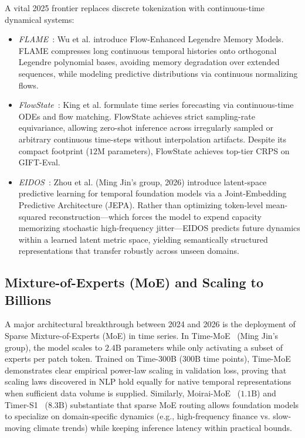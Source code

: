 A vital 2025 frontier replaces discrete tokenization with continuous-time dynamical systems:
\begin{itemize}[leftmargin=*]
    \item \emph{FLAME}~\cite{wu2025flame}: Wu et al. introduce Flow-Enhanced Legendre Memory Models. FLAME compresses long continuous temporal histories onto orthogonal Legendre polynomial bases, avoiding memory degradation over extended sequences, while modeling predictive distributions via continuous normalizing flows.
    \item \emph{FlowState}~\cite{king2025flowstate}: King et al. formulate time series forecasting via continuous-time ODEs and flow matching. FlowState achieves strict sampling-rate equivariance, allowing zero-shot inference across irregularly sampled or arbitrary continuous time-steps without interpolation artifacts. Despite its compact footprint ($12\text{M}$ parameters), FlowState achieves top-tier CRPS on GIFT-Eval.
    \item \emph{EIDOS}~\cite{zhou2026eidos}: Zhou et al. (Ming Jin's group, 2026) introduce latent-space predictive learning for temporal foundation models via a Joint-Embedding Predictive Architecture (JEPA). Rather than optimizing token-level mean-squared reconstruction—which forces the model to expend capacity memorizing stochastic high-frequency jitter—EIDOS predicts future dynamics within a learned latent metric space, yielding semantically structured representations that transfer robustly across unseen domains.
\end{itemize}

\subsection{Mixture-of-Experts (MoE) and Scaling to Billions}
A major architectural breakthrough between 2024 and 2026 is the deployment of Sparse Mixture-of-Experts (MoE) in time series. In Time-MoE~\cite{shi2024timemoe} (Ming Jin's group), the model scales to $2.4\text{B}$ parameters while only activating a subset of experts per patch token. Trained on Time-300B ($300\text{B}$ time points), Time-MoE demonstrates clear empirical power-law scaling in validation loss, proving that scaling laws discovered in NLP hold equally for native temporal representations when sufficient data volume is supplied. Similarly, Moirai-MoE~\cite{woo2024moiraimoe} ($1.1\text{B}$) and Timer-S1~\cite{thuml2026timers1} ($8.3\text{B}$) substantiate that sparse MoE routing allows foundation models to specialize on domain-specific dynamics (e.g., high-frequency finance vs. slow-moving climate trends) while keeping inference latency within practical bounds.

